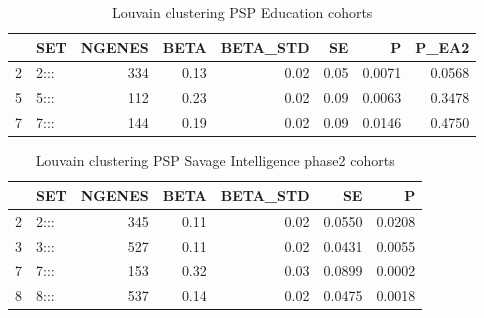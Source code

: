 
\begin{table}[ht]
\centering
\begin{tabular}{rlrrrrrr}
  \hline
 & SET & NGENES & BETA & BETA\_STD & SE & P & P\_EA2 \\ 
  \hline
2 & 2::: & 334 & 0.13 & 0.02 & 0.05 & 0.0071 & 0.0568 \\ 
  5 & 5::: & 112 & 0.23 & 0.02 & 0.09 & 0.0063 & 0.3478 \\ 
  7 & 7::: & 144 & 0.19 & 0.02 & 0.09 & 0.0146 & 0.4750 \\ 
   \hline
\end{tabular}
\caption{Louvain clustering PSP Education cohorts}
\label{tab:Louvain clustering education}
\end{table}

\begin{table}[ht]
\centering
\begin{tabular}{rlrrrrr}
  \hline
 & SET & NGENES & BETA & BETA\_STD & SE & P \\ 
  \hline
2 & 2::: & 345 & 0.11 & 0.02 & 0.0550 & 0.0208 \\ 
  3 & 3::: & 527 & 0.11 & 0.02 & 0.0431 & 0.0055 \\ 
  7 & 7::: & 153 & 0.32 & 0.03 & 0.0899 & 0.0002 \\ 
  8 & 8::: & 537 & 0.14 & 0.02 & 0.0475 & 0.0018 \\ 
   \hline
\end{tabular}
\caption{Louvain clustering PSP Savage Intelligence phase2 cohorts}
\label{tab:Louvain clustering Savage intelligence phase 2 cohorts}
\end{table}


